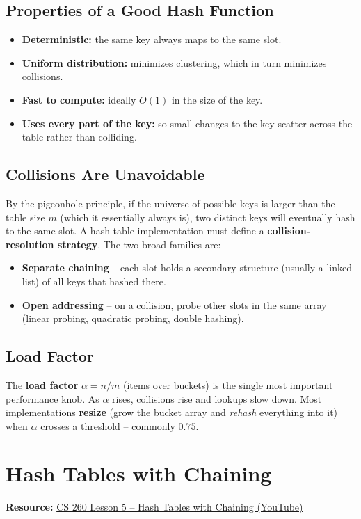 \documentclass[11pt]{article}
\begin{document}
\subsection*{Properties of a Good Hash Function}
\begin{itemize}[leftmargin=*]
    \item \textbf{Deterministic:} the same key always maps to the same slot.
    \item \textbf{Uniform distribution:} minimizes clustering, which in turn
          minimizes collisions.
    \item \textbf{Fast to compute:} ideally $O(1)$ in the size of the key.
    \item \textbf{Uses every part of the key:} so small changes to the key
          scatter across the table rather than colliding.
\end{itemize}

\subsection*{Collisions Are Unavoidable}
By the pigeonhole principle, if the universe of possible keys is larger
than the table size $m$ (which it essentially always is), two distinct
keys will eventually hash to the same slot. A hash-table implementation
must define a \textbf{collision-resolution strategy}. The two broad
families are:
\begin{itemize}[leftmargin=*]
    \item \textbf{Separate chaining} -- each slot holds a secondary
          structure (usually a linked list) of all keys that hashed there.
    \item \textbf{Open addressing} -- on a collision, probe other slots in
          the same array (linear probing, quadratic probing, double
          hashing).
\end{itemize}

\subsection*{Load Factor}
The \textbf{load factor} $\alpha = n / m$ (items over buckets) is the
single most important performance knob. As $\alpha$ rises, collisions
rise and lookups slow down. Most implementations \textbf{resize} (grow
the bucket array and \emph{rehash} everything into it) when $\alpha$
crosses a threshold -- commonly $0.75$.

\section{Hash Tables with Chaining}
\textbf{Resource:} \href{https://www.youtube.com/watch?v=9IXCdJA8O3c}{CS 260 Lesson 5 -- Hash Tables with Chaining (YouTube)}
\end{document}
